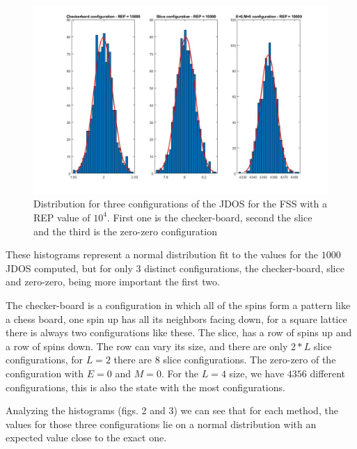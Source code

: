 \documentclass[a4paper, 11pt]{article}
\begin{document}
	\begin{figure}[h]
		\includegraphics[scale=0.27]{hist_10E4_new_rps}
		\centering
		\caption{Distribution for three configurations of the JDOS for the FSS with a REP value of $10^4$. First one is the checker-board, second the slice and the third is the zero-zero configuration}
	\end{figure}

	\newpage
	
	These histograms represent a normal distribution fit to the values for the $1000$ JDOS computed, but for only $3$ distinct configurations, the checker-board, slice and zero-zero, being more important the first two. 
	
	The checker-board is a configuration in which all of the spins form a pattern like a chess board, one spin up has all its neighbors facing down, for a square lattice there is always two configurations like these. The slice, has a row of spins up and a row of spins down. The row can vary its size, and there are only $2*L$ slice configurations, for $L=2$ there are $8$ slice configurations. The zero-zero of the configuration with $E=0$ and $M=0$. For the $L=4$ size, we have $4356$ different configurations, this is also the state with the most configurations.
	
	Analyzing the histograms (figs. 2 and 3) we can see that for each method, the values for those three configurations lie on a normal distribution with an expected value close to the exact one.
	
\end{document}

